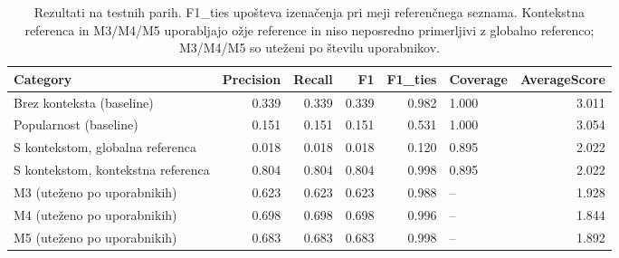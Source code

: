 \begin{table}[h]
\centering
\caption{Rezultati na testnih parih. F1\_ties upošteva izenačenja pri meji referenčnega seznama. Kontekstna referenca in M3/M4/M5 uporabljajo ožje reference in niso neposredno primerljivi z globalno referenco; M3/M4/M5 so uteženi po številu uporabnikov.}
\label{tab:table_4_5}
\begin{tabular}{lrrrrlr}
\toprule
Category & Precision & Recall & F1 & F1\_ties & Coverage & AverageScore \\
\midrule
Brez konteksta (baseline) & 0.339 & 0.339 & 0.339 & 0.982 & 1.000 & 3.011 \\
Popularnost (baseline) & 0.151 & 0.151 & 0.151 & 0.531 & 1.000 & 3.054 \\
S kontekstom, globalna referenca & 0.018 & 0.018 & 0.018 & 0.120 & 0.895 & 2.022 \\
S kontekstom, kontekstna referenca & 0.804 & 0.804 & 0.804 & 0.998 & 0.895 & 2.022 \\
M3 (uteženo po uporabnikih) & 0.623 & 0.623 & 0.623 & 0.988 & -- & 1.928 \\
M4 (uteženo po uporabnikih) & 0.698 & 0.698 & 0.698 & 0.996 & -- & 1.844 \\
M5 (uteženo po uporabnikih) & 0.683 & 0.683 & 0.683 & 0.998 & -- & 1.892 \\
\bottomrule
\end{tabular}

\end{table}
